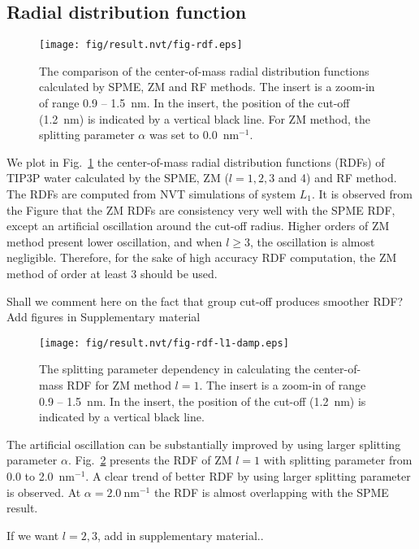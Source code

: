 \documentclass[aip,jcp,a4paper,preprint,unsortedaddress,onecolumn,fleqn]{revtex4-1}
\newcommand{\recheck}[1]{{\color{red} #1}}
\newcommand{\systemlb}{L_1}
\begin{document}
\subsection{Radial distribution function}

\begin{figure}
  \centering
  \texttt{[image: fig/result.nvt/fig-rdf.eps]}  
  \caption{The comparison of the center-of-mass radial distribution functions
    calculated by SPME, ZM and RF methods. The insert is a zoom-in of
    range 0.9 -- 1.5~nm. In the insert, the position of the cut-off
    (1.2~nm) is indicated by a vertical black line.
    For ZM method, the splitting parameter $\alpha$ was set to 0.0~$\textrm{nm}^{-1}$.
  }
  \label{fig:rdf}
\end{figure}

We plot in Fig.~\ref{fig:rdf} the center-of-mass radial distribution functions (RDFs) of TIP3P water
calculated by the SPME, ZM ($l=1,2,3$ and 4) and RF method.  The RDFs
are computed from NVT simulations of system $\systemlb$. It is
observed from the Figure that the ZM RDFs are consistency very well
with the SPME RDF, except an artificial oscillation around the
cut-off radius. Higher orders of ZM method present lower oscillation, and when
$l\geq 3$, the oscillation is almost negligible. Therefore, for the sake
of high accuracy RDF computation, the ZM method of order at least 3 should be used.

\recheck{Shall we comment here on the fact that group cut-off produces smoother RDF? Add figures in Supplementary material}

\begin{figure}
  \centering
  \texttt{[image: fig/result.nvt/fig-rdf-l1-damp.eps]}  
  \caption{
    The splitting parameter dependency in calculating the center-of-mass RDF for
    ZM method $l=1$. The insert is a zoom-in of
    range 0.9 -- 1.5~nm. In the insert, the position of the cut-off
    (1.2~nm) is indicated by a vertical black line.
  }
  \label{fig:rdf-damp}
\end{figure}

The artificial oscillation can be substantially improved by using larger splitting parameter $\alpha$.
Fig.~\ref{fig:rdf-damp} presents the RDF of ZM $l=1$ with splitting parameter from 0.0 to 2.0~$\textrm{nm}^{-1}$.
A clear trend of better RDF by using larger splitting parameter is observed.
At $\alpha = 2.0\ \textrm{nm}^{-1}$ the RDF is almost overlapping with the SPME result.

\recheck{If we want $l=2,3$, add in supplementary material..}
\end{document}
